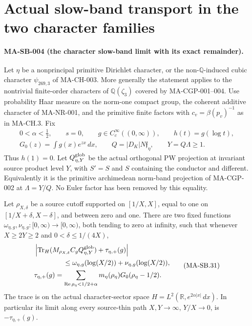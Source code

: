 \section{Actual slow-band transport in the two character families}
\label{sec:character-slow-band}

\paragraph{MA-SB-004 (the character slow-band limit with its exact remainder).}
Let $\eta$ be a nonprincipal primitive Dirichlet character, or
the non-$\mathbb Q$-induced cubic character $\psi_{269,3}$ of
MA-CH-003.  More generally the statement applies to the
nontrivial finite-order characters of $\mathbb Q(\zeta_3)$
covered by MA-CGP-001--004.  Use probability Haar measure
on the norm-one compact group, the coherent additive
character of MA-NR-001, and the primitive finite factors
with $c_v=\beta(p_v)^{-1}$ as in MA-CH.3.
Fix
\[
 \begin{gathered}
 0<\alpha<\tfrac12,\qquad s=0,\qquad
 g\in C_c^\infty((0,\infty)),\qquad h(t)=g(\log t),\\
 G_0(z)=\int g(x)e^{zx}\,dx,\qquad
 Q=|D_K|N\mathfrak f_\eta,\qquad Y=Q\Lambda\ge1.
\end{gathered}
 \tag{MA-SB.30}
\]
Thus $h(1)=0$.  Let $Q_{\eta,Y}^{\rm glob}$ be the actual
orthogonal PW projection at invariant source product level
$Y$, with $S'=S$ and $S$ containing the conductor and
different.  Equivalently it is the primitive archimedean
norm-band projection of MA-CGP-002 at $\Lambda=Y/Q$.
No Euler factor has been removed by this equality.

Let $\rho_{X,\delta}$ be a source cutoff supported on
$[1/X,X]$, equal to one on
$[1/X+\delta,X-\delta]$, and between zero and one.
There are two fixed functions
$\omega_{\eta,g},\nu_{\eta,g}:[0,\infty)\to[0,\infty)$,
both tending to zero at infinity, such that whenever
$X\ge2Y\ge2$ and $0<\delta\le1/(4X)$,
\[
 \begin{split}
 &\left|\operatorname{Tr}_H
      (M_{\rho_{X,\delta}}C_gQ_{\eta,Y}^{\rm glob})
                +\tau_{\eta,+}(g)\right|\\
 &\hspace{15mm}\le
    \omega_{\eta,g}(\log(X/2))
        +\nu_{\eta,g}(\log(X/2)),\\
 &\tau_{\eta,+}(g)
     =\sum_{\operatorname{Re}\rho_\eta<1/2+\alpha}
                 m_\eta(\rho_\eta)G_0(\rho_\eta-1/2).
\end{split}
 \tag{MA-SB.31}
\]
The trace is on the actual character-sector space
$H=L^2(\mathbb R,e^{2\alpha|x|}\,dx)$.
In particular its limit along every source-thin path
$X,Y\to\infty$, $Y/X\to0$, is $-\tau_{\eta,+}(g)$.

